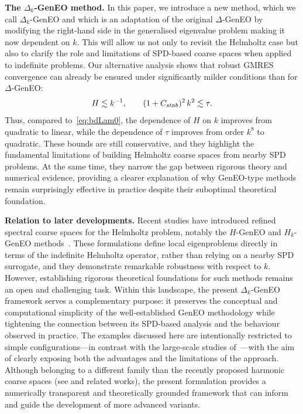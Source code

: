 \documentclass[preprint,3p,times]{elsarticle}
\newcommand{\Cstab}{C_{\textup{\textsf{stab}}}}
\theoremstyle{definition}
\numberwithin{equation}{section}
\begin{document}
\medskip
\noindent
\textbf{The $\Delta_k$-GenEO method.} In this paper, we introduce a new method, which we call $\Delta_k$-GenEO and 
which is an adaptation of the original $\Delta$-GenEO by modifying the right-hand side in the generalised eigenvalue problem 
making it now dependent on $k$. 
This will allow us not only to revisit the Helmholtz case but also to  clarify the role and limitations of SPD-based coarse spaces 
when applied to indefinite problems. 
Our alternative analysis shows that robust GMRES convergence can already be ensured under significantly milder conditions than for $\Delta$-GenEO:
\begin{equation}
\label{eq:delta_results_improved}
   H \lesssim k^{-1}, 
   \qquad 
   (1+\Cstab)^2 \, k^2 \lesssim \tau.
\end{equation}
Thus, compared to~\eqref{eq:bdLam0}, the dependence of $H$ on $k$ improves from quadratic to linear, while the dependence of $\tau$ improves from order $k^8$ to quadratic. These bounds are still conservative, and they highlight the fundamental limitations of building Helmholtz coarse spaces from nearby SPD problems. At the same time, they narrow the gap between rigorous theory and numerical evidence, providing a clearer explanation of why GenEO-type methods remain surprisingly effective in practice despite their suboptimal theoretical foundation.


\medskip
\noindent
\textbf{Relation to later developments.} 
Recent studies have introduced refined spectral coarse spaces for the Helmholtz problem, notably the $H$-GenEO and \( H_k \)-GenEO methods~\cite{Bootland:2021:ACS, Bootland:2022:CDG}. 
These formulations define local eigenproblems directly in terms of the indefinite Helmholtz operator, rather than relying on a nearby SPD surrogate, and they demonstrate remarkable robustness with respect to \( k \). 
However, establishing rigorous theoretical foundations for such methods remains an open and challenging task. 
Within this landscape, the present \( \Delta_k \)-GenEO framework serves a complementary purpose: it preserves the conceptual and computational simplicity of the well-established GenEO methodology while tightening the connection between its SPD-based analysis and the behaviour observed in practice. 
The examples discussed here are intentionally restricted to simple configurations---in contrast with the large-scale studies of~\cite{Operto:2023:I3F, Tournier:2019:MTI, Tournier:2022:3FD}---with the aim of clearly exposing both the advantages and the limitations of the approach. 
Although belonging to a different family than the recently proposed harmonic coarse spaces (see \cite{Ma:2025:TLR} and related works), the present formulation provides a numerically transparent and theoretically grounded framework that can inform and guide the development of more advanced variants.
\end{document}
